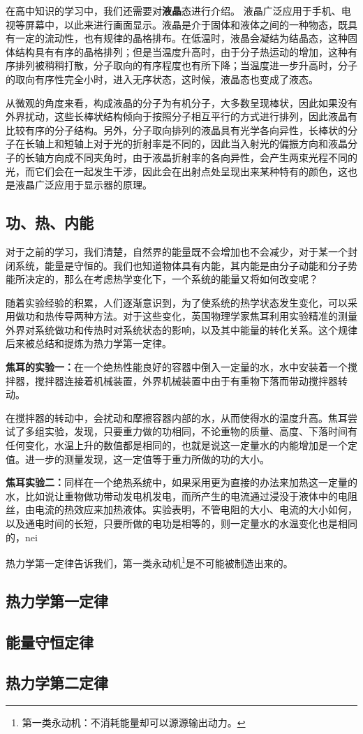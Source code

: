 在高中知识的学习中，我们还需要对\textbf{液晶}态进行介绍。 液晶广泛应用于手机、电视等屏幕中，以此来进行画面显示。液晶是介于固体和液体之间的一种物态，既具有一定的流动性，也有规律的晶格排布。在低温时，液晶会凝结为结晶态，这种固体结构具有有序的晶格排列；但是当温度升高时，由于分子热运动的增加，这种有序排列被稍稍打散，分子取向的有序程度也有所下降；当温度进一步升高时，分子的取向有序性完全小时，进入无序状态，这时候，液晶态也变成了液态。

从微观的角度来看，构成液晶的分子为有机分子，大多数呈现棒状，因此如果没有外界扰动，这些长棒状结构倾向于按照分子相互平行的方式进行排列，因此液晶有比较有序的分子结构。另外，分子取向排列的液晶具有光学各向异性，长棒状的分子在长轴上和短轴上对于光的折射率是不同的，因此当入射光的偏振方向和液晶分子的长轴方向成不同夹角时，由于液晶折射率的各向异性，会产生两束光程不同的光，而它们会在一起发生干涉，因此会在出射点处呈现出来某种特有的颜色，这也是液晶广泛应用于显示器的原理。
\subsection{功、热、内能}

对于之前的学习，我们清楚，自然界的能量既不会增加也不会减少，对于某一个封闭系统，能量是守恒的。我们也知道物体具有内能，其内能是由分子动能和分子势能所决定的，那么在考虑热学变化下，一个系统的能量又将如何改变呢？

随着实验经验的积累，人们逐渐意识到，为了使系统的热学状态发生变化，可以采用做功和热传导两种方法。对于这些变化，英国物理学家焦耳利用实验精准的测量外界对系统做功和传热时对系统状态的影响，以及其中能量的转化关系。这个规律后来被总结和提炼为热力学第一定律。

\textbf{焦耳的实验一：}在一个绝热性能良好的容器中倒入一定量的水，水中安装着一个搅拌器，搅拌器连接着机械装置，外界机械装置中由于有重物下落而带动搅拌器转动。

在搅拌器的转动中，会扰动和摩擦容器内部的水，从而使得水的温度升高。焦耳尝试了多组实验，发现，只要重力做的功相同，不论重物的质量、高度、下落时间有任何变化，水温上升的数值都是相同的，也就是说这一定量水的内能增加是一个定值。进一步的测量发现，这一定值等于重力所做的功的大小。

\textbf{焦耳实验二：}同样在一个绝热系统中，如果采用更为直接的办法来加热这一定量的水，比如说让重物做功带动发电机发电，而所产生的电流通过浸没于液体中的电阻丝，由电流的热效应来加热液体。实验表明，不管电阻的大小、电流的大小如何，以及通电时间的长短，只要所做的电功是相等的，则一定量水的水温变化也是相同的，nei

热力学第一定律告诉我们，第一类永动机\footnote{第一类永动机：不消耗能量却可以源源输出动力。}是不可能被制造出来的。
\subsection{热力学第一定律}
\subsection{能量守恒定律}
\subsection{热力学第二定律}

 


